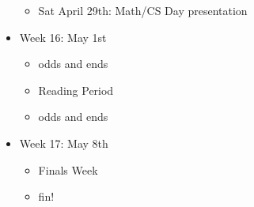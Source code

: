 \begin{itemize}
\begin{itemize}
  	\item Sat April 29th: Math/CS Day presentation
  \end{itemize}
  \item Week 16: May 1st
  \begin{itemize}
  \item odds and ends
  \end{itemize}
  \begin{itemize}
    \item Reading Period
    \item odds and ends
  \end{itemize}
  \item Week 17: May 8th
  \begin{itemize}
    \item Finals Week
    \item fin!
  \end{itemize}

\end{itemize}